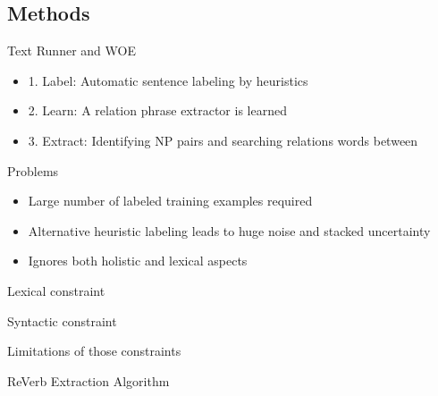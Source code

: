 \documentclass[11pt]{beamer}
\begin{document}
	\subsection{Methods}
		\begin{frame}{Text Runner and WOE}
			\begin{center}
				\begin{itemize}
				\item 1. Label: Automatic sentence labeling by heuristics
				\item 2. Learn: A relation phrase extractor is learned
				\item 3. Extract: Identifying NP pairs and searching relations words between
				\end{itemize}
			\end{center}
		\end{frame}
		\begin{frame}{Problems}
					\begin{center}
						\begin{itemize}
						\item Large number of labeled training examples required
						\item Alternative heuristic labeling leads to huge noise and stacked uncertainty
						\item Ignores both holistic and lexical aspects 
						\end{itemize}
					\end{center}
				\end{frame}
		
		
		\begin{frame}{Lexical constraint}
			\begin{center}
				
			\end{center}
		\end{frame}
		\begin{frame}{Syntactic constraint}
			\begin{center}
				
			\end{center}
		\end{frame}
		\begin{frame}{Limitations of those constraints}
			\begin{center}
				
			\end{center}
		\end{frame}
		\begin{frame}{ReVerb Extraction Algorithm}
			\begin{center}
				
			\end{center}
		\end{frame}
\end{document}
